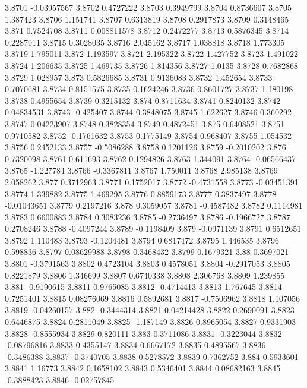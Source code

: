 3.8701  -0.03957567
3.8702  0.4727222
3.8703  0.3949799
3.8704  0.8736607
3.8705  1.387423
3.8706  1.151741
3.8707  0.6313819
3.8708  0.2917873
3.8709  0.3148465
3.871  0.7524708
3.8711  0.008811578
3.8712  0.2472277
3.8713  0.5876345
3.8714  0.2287911
3.8715  0.3028035
3.8716  2.045162
3.8717  1.038818
3.8718  1.773305
3.8719  1.795011
3.872  1.193597
3.8721  2.195322
3.8722  1.427752
3.8723  1.491022
3.8724  1.206635
3.8725  1.469735
3.8726  1.814356
3.8727  1.0135
3.8728  0.7682868
3.8729  1.028957
3.873  0.5826685
3.8731  0.9136083
3.8732  1.452654
3.8733  0.7070681
3.8734  0.8151575
3.8735  0.1624246
3.8736  0.8601727
3.8737  1.180198
3.8738  0.4955654
3.8739  0.3215132
3.874  0.8711634
3.8741  0.8240132
3.8742  0.04834531
3.8743  -0.425407
3.8744  0.3848075
3.8745  1.622627
3.8746  0.360292
3.8747  0.04223907
3.8748  0.3828354
3.8749  0.4872451
3.875  0.6408521
3.8751  0.9710582
3.8752  -0.1761632
3.8753  0.1775149
3.8754  0.968407
3.8755  1.054532
3.8756  0.2452133
3.8757  -0.5086288
3.8758  0.1201126
3.8759  -0.2010202
3.876  0.7320098
3.8761  0.611693
3.8762  0.1294826
3.8763  1.344091
3.8764  -0.06566437
3.8765  -1.227784
3.8766  -0.3367811
3.8767  1.750011
3.8768  2.985138
3.8769  2.058262
3.877  0.3712963
3.8771  0.1752017
3.8772  -0.4731558
3.8773  -0.03451391
3.8774  1.339882
3.8775  1.469295
3.8776  0.8859173
3.8777  0.3837497
3.8778  -0.01043651
3.8779  0.2197216
3.878  0.3059057
3.8781  -0.4587482
3.8782  0.1114981
3.8783  0.6600883
3.8784  0.3083236
3.8785  -0.2736497
3.8786  -0.1966727
3.8787  0.2708246
3.8788  -0.4097244
3.8789  -0.1198409
3.879  -0.0971139
3.8791  0.6512651
3.8792  1.110483
3.8793  -0.1204481
3.8794  0.6817472
3.8795  1.446535
3.8796  0.598836
3.8797  0.08629988
3.8798  0.3468432
3.8799  0.1679321
3.88  0.3697021
3.8801  -0.3791563
3.8802  0.4723104
3.8803  0.4578051
3.8804  -0.2917053
3.8805  0.8221879
3.8806  1.346699
3.8807  0.6740338
3.8808  2.306768
3.8809  1.239855
3.881  -0.9190615
3.8811  0.9765085
3.8812  -0.4714413
3.8813  1.767645
3.8814  0.7251401
3.8815  0.08276069
3.8816  0.5892681
3.8817  -0.7506962
3.8818  1.107056
3.8819  -0.04260157
3.882  -0.3444314
3.8821  0.04214428
3.8822  0.2690091
3.8823  0.6446875
3.8824  0.2811049
3.8825  -1.187149
3.8826  0.8965054
3.8827  0.9331903
3.8828  -0.8555934
3.8829  0.820111
3.883  0.3711086
3.8831  -0.3223044
3.8832  -0.08796816
3.8833  0.4355147
3.8834  0.6667172
3.8835  0.4895567
3.8836  -0.3486388
3.8837  -0.3740705
3.8838  0.5278572
3.8839  0.7362752
3.884  0.5933601
3.8841  1.16773
3.8842  0.1658102
3.8843  0.5346401
3.8844  0.08682163
3.8845  -0.3888423
3.8846  -0.02757845
